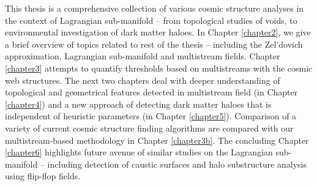 This thesis is a comprehensive collection of various cosmic structure analyses in the context of Lagrangian sub-manifold -- from topological studies of voids, to environmental investigation of dark matter haloes. In Chapter \ref{chapter2}, we give a brief overview of topics related to rest of the thesis -- including the Zel'dovich approximation, Lagrangian sub-manifold and multistream fields. Chapter \ref{chapter3} attempts to quantify thresholds based on multistreams with the cosmic web structures. The next two chapters deal with deeper understanding of topological and geometrical features detected in multistream field (in Chapter \ref{chapter4}) and a new approach of detecting dark matter haloes that is independent of heuristic parameters (in Chapter \ref{chapter5}). Comparison of a variety of current cosmic structure finding algorithms are compared with our multistream-based methodology in Chapter \ref{chapter3b}. The concluding Chapter \ref{chapter6} highlights future avenue of similar studies on the Lagrangian sub-manifold -- including detection of caustic surfaces and halo substructure analysis using flip-flop fields. 




